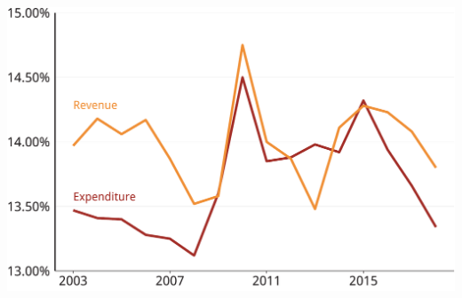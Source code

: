 \documentclass[tikz]{standalone}\usepackage[]{graphicx}\usepackage[]{color}
\newenvironment{knitrout}{}{} %
\begin{document}
\clearpage
\begin{knitrout}
\color{fgcolor}
\includegraphics[width=11.000in,height=7.00in]{./b5-figure/FISCAL-Figure11-1} 

\end{knitrout}
\end{document}
